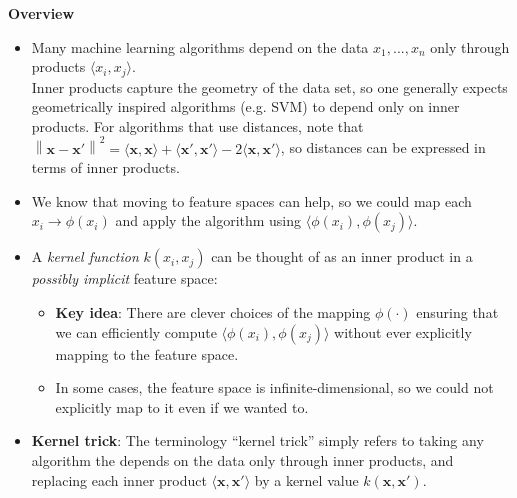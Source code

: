\documentclass[twoside]{article}
\newcommand{\norm}[1]{\left\lVert #1 \right\rVert}
\begin{document}
\textbf{Overview}
\begin{itemize}
    \item Many machine learning algorithms depend on the data $x_1,...,x_n$ only through products $\langle x_i, x_j \rangle$.\\
    Inner products capture the geometry of the data set, so one generally expects geometrically inspired algorithms (e.g. SVM) to depend only on inner products. For algorithms that use distances, note that $\norm{\boldsymbol{x} - \boldsymbol{x'}}^2 = \langle \boldsymbol{x}, \boldsymbol{x} \rangle + \langle \boldsymbol{x'}, \boldsymbol{x'} \rangle - 2\langle \boldsymbol{x}, \boldsymbol{x'} \rangle$, so distances can be expressed in terms of inner products.
    \item We know that moving to feature spaces can help, so we could map each $x_i \rightarrow \phi(x_i)$ and apply the algorithm using $\langle \phi(x_i), \phi(x_j) \rangle$.
    \item A \textit{kernel function} $k(x_i, x_j)$ can be thought of as an inner product in a \textit{possibly implicit} feature space:
    \begin{itemize}
        \item \textbf{Key idea}: There are clever choices of the mapping $\phi(\cdot)$  ensuring that we can efficiently compute $\langle \phi(x_i), \phi(x_j) \rangle$ without ever explicitly mapping to the feature space.
        \item In some cases, the feature space is infinite-dimensional, so we could not explicitly map to it even if we wanted to.
    \end{itemize}
    \item \textbf{Kernel trick}: The terminology “kernel trick” simply refers to taking any algorithm the depends on the data only through inner products, and replacing each inner product $\langle \boldsymbol{x}, \boldsymbol{x'} \rangle$ by a kernel value $k(\boldsymbol{x}, \boldsymbol{x'})$.
\end{itemize}\medskip
\end{document}
